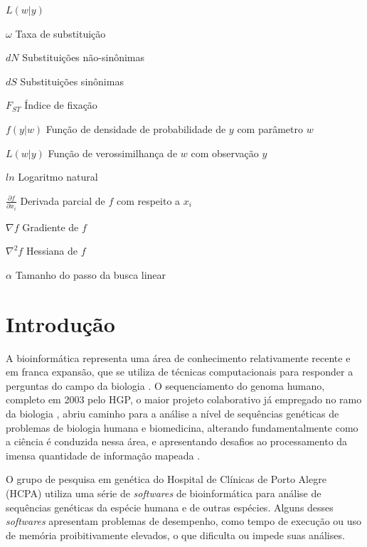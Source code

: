 \documentclass[cic,tc]{iiufrgs}
\begin{document}
\begin{listofsymbols}{$L(w|y)$}
    \item[$\omega$] Taxa de substituição
    \item[$dN$] Substituições não-sinônimas
    \item[$dS$] Substituições sinônimas
    \item[$F_{ST}$] Índice de fixação
    \item[$f(y|w)$] Função de densidade de probabilidade de $y$ com parâmetro $w$
    \item[$L(w|y)$] Função de verossimilhança de $w$ com observação $y$
    \item[$ln$] Logaritmo natural
    \item[$\frac{\partial f}{\partial x_i}$] Derivada parcial de $f$ com respeito a $x_i$
    \item[$\nabla f$] Gradiente de $f$
    \item[$\nabla^2 f$] Hessiana de $f$
    \item[$\alpha$] Tamanho do passo da busca linear
\end{listofsymbols}

\tableofcontents

%
%
%
%

\chapter{Introdução}

%
%
A bioinformática representa uma área de conhecimento relativamente recente e em
franca expansão, que se utiliza de técnicas computacionais para responder a
perguntas do campo da biologia \cite{baxevanis2020bioinformatics}. O
sequenciamento do genoma humano, completo em 2003 pelo HGP, o maior projeto
colaborativo já empregado no ramo da biologia \cite{tripp2011economic}, abriu
caminho para a análise a nível de sequências genéticas de problemas de biologia
humana e biomedicina, alterando fundamentalmente como a ciência é conduzida
nessa área, e apresentando desafios ao processamento da imensa quantidade de
informação mapeada \cite{baxevanis2020bioinformatics}.

%
%
O grupo de pesquisa em genética do Hospital de Clínicas de Porto Alegre (HCPA)
utiliza uma série de \textit{softwares} de bioinformática para análise de sequências
genéticas da espécie humana e de outras espécies. Alguns desses \textit{softwares}
apresentam problemas de desempenho, como tempo de execução ou uso de memória
proibitivamente elevados, o que dificulta ou impede suas análises.
\end{document}
